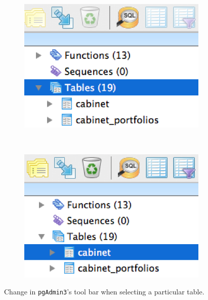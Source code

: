 \begin{figure}[ht!]
\centering
  \begin{subfigure}{.45\textwidth}
  \includegraphics[width=\textwidth,trim= 0 0 0 0, clip]{pcdb_documentation_screenshots/pgadmin3_select_tables_toolbar.png}
    \label{fig_pgadmin3_select_tables_toolbar}
  \end{subfigure}
  ~%
  \begin{subfigure}{.45\textwidth}
  \includegraphics[width=\textwidth,trim= 0 0 0 0, clip]{pcdb_documentation_screenshots/pgadmin3_select_a_table_toolbar.png}
    \label{fig_pgadmin3_select_a_table_toolbar}
  \end{subfigure} 
  \caption{Change in \texttt{pgAdmin3}'s tool bar when selecting a particular table.}
\end{figure}

  
  

